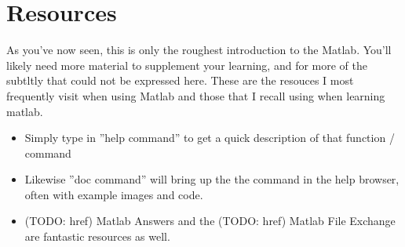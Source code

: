 
\section{Resources}
As you've now seen, this is only the roughest introduction to the Matlab.
 You'll likely need more material to supplement your learning, and for more of the subtltly that could not be expressed here.
 These are the resouces I most frequently visit when using Matlab and those that I recall using when learning matlab.

\begin{itemize}
 \item Simply type in ''help command'' to get a quick description of that function / command
 \item Likewise ''doc command'' will bring up the the command in the help browser, often with example images and code.
 \item (TODO: href) Matlab Answers and the (TODO: href) Matlab File Exchange are fantastic resources as well.
\end{itemize}
